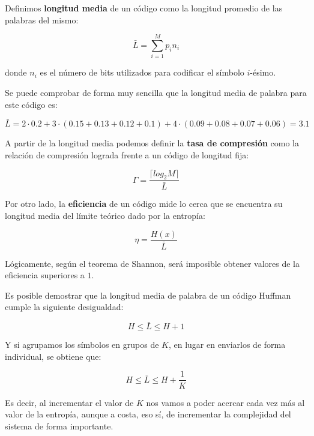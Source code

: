 \documentclass[es,apuntes]{uah}
\begin{document}
Definimos {\bf longitud media} de un código como la longitud promedio de las palabras del mismo:

\begin{equation}
\bar{L} = \sum_{i=1}^M p_i n_i	
\end{equation}

donde $n_i$ es el número de bits utilizados para codificar el símbolo $i$-ésimo. 

Se puede comprobar de forma muy sencilla que la longitud media de palabra para este código es:

\begin{displaymath}
	\bar{L} = 2\cdot 0.2 + 3 \cdot (0.15 + 0.13 + 0.12 + 0.1) + 4 \cdot (0.09 + 0.08 + 0.07 + 0.06) = 3.1
\end{displaymath}

A partir de la longitud media podemos definir la {\bf tasa de compresión} como la relación de compresión lograda frente a un código de longitud fija:

\begin{equation}
	\Gamma = \frac{\lceil log_2 M \rceil}{\bar{L}}
\end{equation}

Por otro lado, la {\bf eficiencia} de un código mide lo cerca que se encuentra su longitud media del límite teórico dado por la entropía:

\begin{equation}
	\eta = \frac{H(x)}{\bar{L}}
\end{equation}

Lógicamente, según el teorema de Shannon, será imposible obtener valores de la eficiencia superiores a $1$. 

Es posible demostrar que la longitud media de palabra de un código Huffman cumple la siguiente desigualdad:

\begin{equation}
	H \leq \bar{L} \leq H+1
\end{equation}

Y si agrupamos los símbolos en grupos de $K$, en lugar en enviarlos de forma individual, se obtiene que:

\begin{equation}
	H \leq \bar{L} \leq H + \frac{1}{K}
\end{equation}

Es decir, al incrementar el valor de $K$ nos vamos a poder acercar cada vez más al valor de la entropía, aunque a costa, eso sí, de incrementar la complejidad del sistema de forma importante. 
\end{document}
